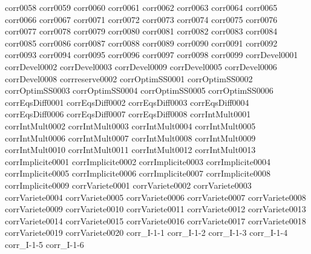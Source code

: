 {corr0058}
{corr0059}
{corr0060}
{corr0061}
{corr0062}
{corr0063}
{corr0064}
{corr0065}
{corr0066}
{corr0067}
{corr0071}
{corr0072}
{corr0073}
{corr0074}
{corr0075}
{corr0076}
{corr0077}
{corr0078}
{corr0079}
{corr0080}
{corr0081}
{corr0082}
{corr0083}
{corr0084}
{corr0085}
{corr0086}
{corr0087}
{corr0088}
{corr0089}
{corr0090}
{corr0091}
{corr0092}
{corr0093}
{corr0094}
{corr0095}
{corr0096}
{corr0097}
{corr0098}
{corr0099}
{corrDevel0001}
{corrDevel0002}
{corrDevel0003}
{corrDevel0009}
{corrDevel0005}
{corrDevel0006}
{corrDevel0008}
{corrreserve0002}
{corrOptimSS0001}
{corrOptimSS0002}
{corrOptimSS0003}
{corrOptimSS0004}
{corrOptimSS0005}
{corrOptimSS0006}
{corrEqsDiff0001}
{corrEqsDiff0002}
{corrEqsDiff0003}
{corrEqsDiff0004}
{corrEqsDiff0006}
{corrEqsDiff0007}
{corrEqsDiff0008}
{corrIntMult0001}
{corrIntMult0002}
{corrIntMult0003}
{corrIntMult0004}
{corrIntMult0005}
{corrIntMult0006}
{corrIntMult0007}
{corrIntMult0008}
{corrIntMult0009}
{corrIntMult0010}
{corrIntMult0011}
{corrIntMult0012}
{corrIntMult0013}
{corrImplicite0001}
{corrImplicite0002}
{corrImplicite0003}
{corrImplicite0004}
{corrImplicite0005}
{corrImplicite0006}
{corrImplicite0007}
{corrImplicite0008}
{corrImplicite0009}
{corrVariete0001}
{corrVariete0002}
{corrVariete0003}
{corrVariete0004}
{corrVariete0005}
{corrVariete0006}
{corrVariete0007}
{corrVariete0008}
{corrVariete0009}
{corrVariete0010}
{corrVariete0011}
{corrVariete0012}
{corrVariete0013}
{corrVariete0014}
{corrVariete0015}
{corrVariete0016}
{corrVariete0017}
{corrVariete0018}
{corrVariete0019}
{corrVariete0020}
{corr_I-1-1}
{corr_I-1-2}
{corr_I-1-3}
{corr_I-1-4}
{corr_I-1-5}
{corr_I-1-6}
